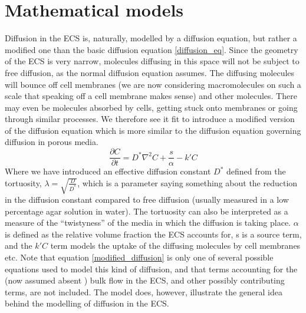 \documentclass[a4paper,english, 12pt, twoside]{article}
\renewcommand{\d}{\partial}
\begin{document}
\section{Mathematical models}
Diffusion in the ECS is, naturally, modelled by a diffusion equation, but rather a modified one than the basic diffusion equation \ref{diffusion_eq}. 
Since the geometry of the ECS is very narrow, molecules diffusing in this space will not be subject to free diffusion, as the normal diffusion equation assumes. 
The diffusing molecules will bounce off cell membranes (we are now considering macromolecules on such a scale that speaking off a cell membrane makes sense) and other molecules. 
There may even be molecules absorbed by cells, getting stuck onto membranes or going through similar processes. 
We therefore see it fit to introduce a modified version of the diffusion equation which is more similar to the diffusion equation governing diffusion in porous media. 
\begin{equation}\label{modified_diffusion}
  \frac{\d C}{\d t} = D^*\nabla^2C +\frac{s}{\alpha} -k'C
\end{equation}
Where we have introduced an effective diffusion constant $D^*$ defined from the tortuosity, $\lambda = \sqrt{\frac{D}{D^*}}$, which is a parameter saying something about the reduction in the diffusion constant compared to free diffusion (usually measured in a low percentage agar solution in water). 
The tortuosity can also be interpreted as a measure of the ``twistyness'' of the media in which the diffusion is taking place. 
$\alpha$ is defined as the relative volume fraction the ECS accounts for, s is a source term, and the $k'C$ term models the uptake of the diffusing molecules by cell membranes etc. 
Note that equation \ref{modified_diffusion} is only one of several possible equations used to model this kind of diffusion, and that terms accounting for the (now assumed absent \cite{nicholson2001diffusion}) bulk flow in the ECS, and other possibly contributing terms, are not included. 
The model does, however, illustrate the general idea behind the modelling of diffusion in the ECS.
\end{document}
